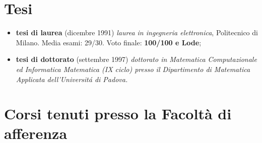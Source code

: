 \documentclass[11pt]{article}
\begin{document}
\section{Tesi}

\begin{itemize}
\item[] {\bf tesi di laurea} (dicembre 1991) {\em laurea in ingegneria elettronica},
      Politecnico di Milano. Media esami: 29/30. Voto finale: {\bf 100/100 e Lode};
\item[] {\bf tesi di dottorato} (settembre 1997) {\em dottorato in
         Matematica Computazionale ed Informatica Matematica (IX ciclo)
         presso il Dipartimento di Matematica Applicata
         dell'Universit\'a di Padova.}
\end{itemize}



\section{Corsi tenuti presso la Facolt\`a di afferenza}
\end{document}
